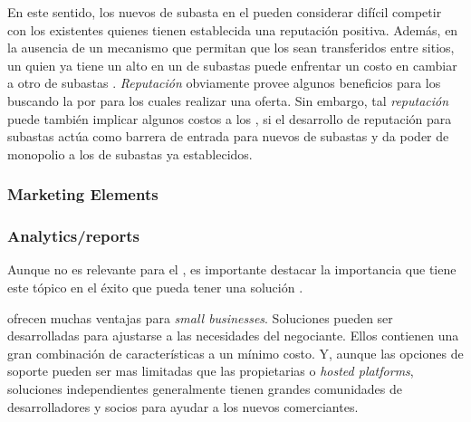 En este sentido, los nuevos \seller de subasta en el \websitesINT pueden considerar difícil competir con los \sellers existentes quienes tienen establecida una reputación positiva. Además, en la ausencia de un mecanismo que permitan que los \ratings sean transferidos entre sitios, un \seller quien ya tiene un alto \rating en un \websiteINT de subastas \online puede enfrentar un costo en cambiar a otro \websiteINT de subastas \online. \textit{Reputación} obviamente provee algunos beneficios para los \consumers buscando la \internetINT por \itemsCOM para los cuales realizar una oferta. Sin embargo, tal \textit{reputación} puede también implicar algunos costos a los \consumers, si el desarrollo de reputación para subastas \online actúa como barrera de entrada para nuevos \websitesINT de  subastas \online  y da poder de monopolio a los \websitesINT de subastas \online ya establecidos\cite{melnik2002does}.

\subsubsection{Marketing Elements}

\subsubsection{Analytics/reports}





Aunque no es relevante para el \frameworkPC, es importante destacar la importancia que tiene este tópico en el éxito que pueda tener una solución \ecommerceCOM. 


\openSourcePC \ecommerceCOM \shoppingCarts ofrecen muchas ventajas para \textit{small businesses}. Soluciones \openSourcePC pueden ser desarrolladas para ajustarse a las necesidades del negociante. Ellos contienen una gran combinación de características a un mínimo costo. Y, aunque las opciones de soporte pueden ser mas limitadas que las propietarias o \textit{hosted platforms}, soluciones independientes \openSourcePC generalmente tienen grandes comunidades de desarrolladores y socios para ayudar a los nuevos comerciantes.